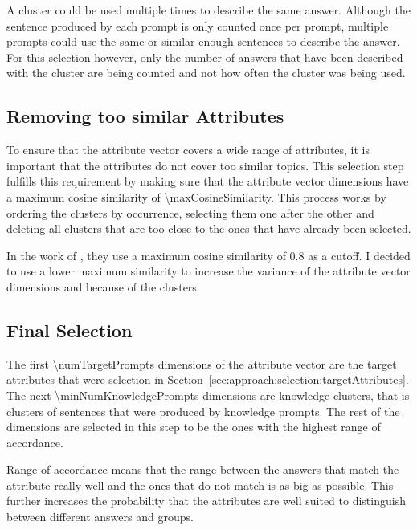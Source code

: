 A cluster could be used multiple times to describe the same answer. Although the sentence produced by each prompt is only counted once per prompt, multiple prompts could use the same or similar enough sentences to describe the answer. For this selection however, only the number of answers that have been described with the cluster are being counted and not how often the cluster was being used.

\subsection{Removing too similar Attributes}
\label{sec:approach:selection:removeSimilar}
To ensure that the attribute vector covers a wide range of attributes, it is important that the attributes do not cover too similar topics. This selection step fulfills this requirement by making sure that the attribute vector dimensions have a maximum cosine similarity of \num{\maxCosineSimilarity}. This process works by ordering the clusters by occurrence, selecting them one after the other and deleting all clusters that are too close to the ones that have already been selected.

In the work of \citeauthor{patelLearningInterpretableStyle2023}, they use a maximum cosine similarity of \num{0.8} as a cutoff. I decided to use a lower maximum similarity to increase the variance of the attribute vector dimensions and because of the clusters. %

\subsection{Final Selection} %
\label{sec:approach:selection:finalSelection}
The first \num{\numTargetPrompts} dimensions of the attribute vector are the target attributes that were selection in Section~\ref{sec:approach:selection:targetAttributes}. The next \num{\minNumKnowledgePrompts} dimensions are knowledge clusters, that is clusters of sentences that were produced by knowledge prompts. The rest of the dimensions are selected in this step to be the ones with the highest range of accordance. %

Range of accordance means that the range between the answers that match the attribute really well and the ones that do not match is as big as possible. This further increases the probability that the attributes are well suited to distinguish between different answers and groups.

